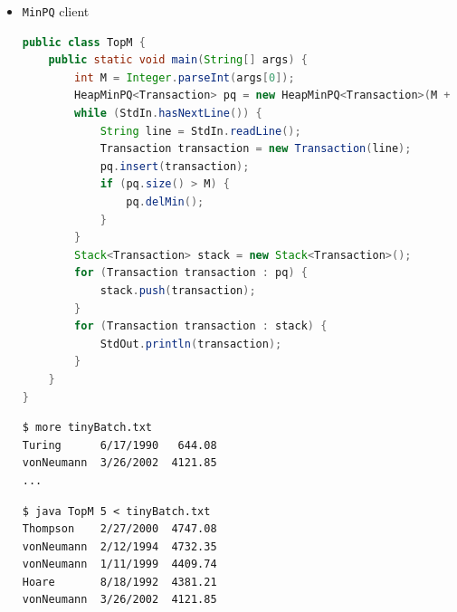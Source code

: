 \documentclass[8pt,a4paper,compress]{beamer}
\begin{document}
\begin{frame}[fragile]
\begin{itemize}
\item \lstinline{MinPQ} client
\begin{lstlisting}[language=Java]
public class TopM {   
    public static void main(String[] args) {
        int M = Integer.parseInt(args[0]); 
        HeapMinPQ<Transaction> pq = new HeapMinPQ<Transaction>(M + 1); 
        while (StdIn.hasNextLine()) {
            String line = StdIn.readLine();
            Transaction transaction = new Transaction(line);
            pq.insert(transaction); 
            if (pq.size() > M) { 
                pq.delMin(); 
            }
        }
        Stack<Transaction> stack = new Stack<Transaction>();
        for (Transaction transaction : pq) { 
            stack.push(transaction); 
        }
        for (Transaction transaction : stack) {
            StdOut.println(transaction); 
        } 
    }
} 
\end{lstlisting} 

\begin{lstlisting}[language={}]
$ more tinyBatch.txt 
Turing      6/17/1990   644.08
vonNeumann  3/26/2002  4121.85
...
\end{lstlisting}

\begin{lstlisting}[language={}]
$ java TopM 5 < tinyBatch.txt 
Thompson    2/27/2000  4747.08
vonNeumann  2/12/1994  4732.35
vonNeumann  1/11/1999  4409.74
Hoare       8/18/1992  4381.21
vonNeumann  3/26/2002  4121.85
\end{lstlisting} 
\end{itemize}
\end{frame}
\end{document}
